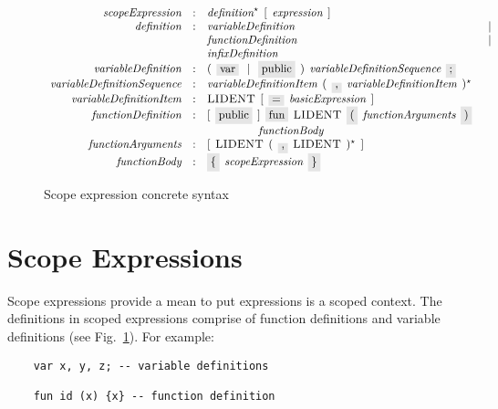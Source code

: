 \begin{figure}[t]
  \[
    \begin{array}{rclc}
      \defterm{scopeExpression}                & : & \nonterm{definition}^\star\s[\s\nonterm{expression}\s]&\\
      \defterm{definition}                     & : & \nonterm{variableDefinition}&\alt\\
                                               &   & \nonterm{functionDefinition}&\alt\\
                                               &   & \nonterm{infixDefinition}&\\
      \defterm{variableDefinition}             & : & (\s\term{var}\alt\term{public}\s)\s\nonterm{variableDefinitionSequence}\s\term{;}&\\
      \defterm{variableDefinitionSequence}     & : & \nonterm{variableDefinitionItem}\s(\s\term{,}\s\nonterm{variableDefinitionItem}\s)^\star&\\
      \defterm{variableDefinitionItem}         & : & \token{LIDENT}\s[\s\term{=}\s\nonterm{basicExpression}\s]&\\
      \defterm{functionDefinition}             & : & [\s\term{public}\s]\s\term{fun}\s\token{LIDENT}\s\term{(}\s\nonterm{functionArguments}\s\term{)}&\\
                                               &   & \phantom{XXXXX}\nonterm{functionBody}&\\
      \defterm{functionArguments}              & : & [\s\token{LIDENT}\s(\s\term{,}\s\token{LIDENT}\s)^\star\s]&\\
      \defterm{functionBody}                   & : & \term{\{}\s\nonterm{scopeExpression}\s\term{\}}&
    \end{array}
  \]
  \caption{Scope expression concrete syntax}
  \label{scope_expression}
\end{figure}

\section{Scope Expressions}
\label{sec:scope_expressions}

Scope expressions provide a mean to put expressions is a scoped context. The definitions in scoped expressions comprise of function definitions and
variable definitions (see Fig.~\ref{scope_expression}). For example:

\begin{lstlisting}
    var x, y, z; -- variable definitions

    fun id (x) {x} -- function definition
\end{lstlisting}

